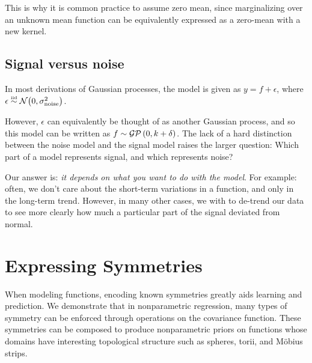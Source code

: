 This is why it is common practice to assume zero mean, since marginalizing over an unknown mean function can be equivalently expressed as a zero-mean \gp{} with a new kernel.




\subsection{Signal versus noise}

In most derivations of Gaussian processes, the model is given as $y = f + \epsilon$, where $\epsilon \overset{\mbox{\tiny iid}}{\sim} \mathcal{N}\!\left(0,\sigma^2_{\textnormal{noise}}\right)$.

However, $\epsilon$ can equivalently be thought of as another Gaussian process, and so this model can be written as $f \sim \mathcal{GP}\left(0, k + \delta \right)$.  The lack of a hard distinction between the noise model and the signal model raises the larger question:  Which part of a model represents signal, and which represents noise?

Our answer is: \emph{it depends on what you want to do with the model}.  For example: often, we don't care about the short-term variations in a function, and only in the long-term trend.  However, in many other cases, we with to de-trend our data to see more clearly how much a particular part of the signal deviated from normal.






\section{Expressing Symmetries}



When modeling functions, encoding known symmetries greatly aids learning and prediction.  We demonstrate that in nonparametric regression, many types of symmetry can be enforced through operations on the covariance function.  These symmetries can be composed to produce nonparametric priors on functions whose domains have interesting topological structure such as spheres, torii, and M\"{o}bius strips.


